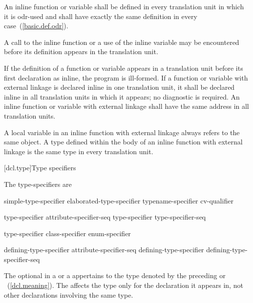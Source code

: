 \pnum
An inline function or variable shall be defined in every translation unit in which
it is odr-used and shall have exactly the same definition in every
case~(\ref{basic.def.odr}).
\begin{note}
A call to the inline function or a use of the inline variable may be encountered before its definition
appears in the translation unit.
\end{note}
If the definition of a function or variable appears in a translation unit before its
first declaration as inline, the program is ill-formed. If a function or variable
with external linkage is declared inline in one translation unit, it
shall be declared inline in all translation units in which it appears;
no diagnostic is required. An inline function or variable with external
linkage shall have the same address in all translation units.
\begin{note}
A  local variable in an inline
function with external linkage always refers to the same object.
A type defined within the body of an inline
function with external linkage is the
same type in every translation unit.
\end{note}

[dcl.type]{Type specifiers}%

\pnum
The type-specifiers are

%
%
%
\begin{bnf}
\br
  simple-type-specifier\br
  elaborated-type-specifier\br
  typename-specifier\br
  cv-qualifier
\end{bnf}

\begin{bnf}
\br
    type-specifier attribute-specifier-seq\opt\br
    type-specifier type-specifier-seq
\end{bnf}

\begin{bnf}
\br
    type-specifier\br
    class-specifier\br
    enum-specifier
\end{bnf}

\begin{bnf}
\br
  defining-type-specifier attribute-specifier-seq\opt\br
  defining-type-specifier defining-type-specifier-seq
\end{bnf}

The optional  in a 
or a 
appertains
to the type denoted by the preceding 
or ~(\ref{dcl.meaning}). The
 affects the type only for the declaration it appears in,
not other declarations involving the same type.

